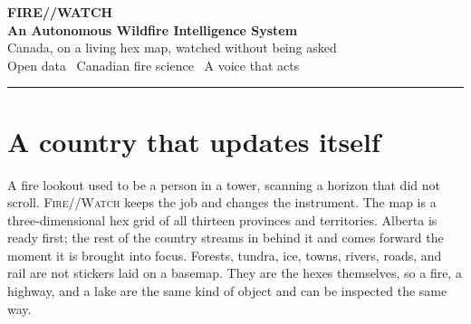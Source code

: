 \documentclass[11pt,a4paper]{article}
\newcommand{\fw}{\textsc{Fire}//\textsc{Watch}}
\begin{document}
\begin{center}
{\color{ember}\Large\bfseries FIRE//WATCH}\\[0.45em]
{\LARGE\bfseries An Autonomous Wildfire Intelligence System}\\[0.7em]
{\color{ash}\large Canada, on a living hex map, watched without being asked}\\[1.15em]
{\color{ash}\normalsize Open data \textperiodcentered\ Canadian fire science \textperiodcentered\ A voice that acts}
\end{center}

\vspace{0.4em}
\noindent\rule{\textwidth}{0.4pt}

\begin{abstract}
\noindent
\fw{} is a wildfire risk system that covers every province and territory of Canada and keeps its own watch. It does not wait for an analyst to refresh a spreadsheet. Satellite detections, fire perimeters, official moisture codes, and a seven-day weather forecast arrive on their own schedule, are cached once for every viewer, and are turned, cell by cell, into the Canadian Fire Weather Index and a fuel-aware projection of where each fire could travel. A small agent named Firefly lives on the map. It briefs the room, flies the camera to the place it is talking about, ranks fires for the crews on hand, and speaks up when a new fire appears, a town enters a projected path, or tomorrow looks extreme. Beside the national picture, a field station polls its own sensors and folds the reading into the same family of fire-weather mathematics. The result is decision support that stays current while people are looking at something else. It is a scenario built from open data and published fire science, not an official forecast.
\end{abstract}

\section{A country that updates itself}

A fire lookout used to be a person in a tower, scanning a horizon that did not scroll. \fw{} keeps the job and changes the instrument. The map is a three-dimensional hex grid of all thirteen provinces and territories. Alberta is ready first; the rest of the country streams in behind it and comes forward the moment it is brought into focus. Forests, tundra, ice, towns, rivers, roads, and rail are not stickers laid on a basemap. They are the hexes themselves, so a fire, a highway, and a lake are the same kind of object and can be inspected the same way.
\end{document}
